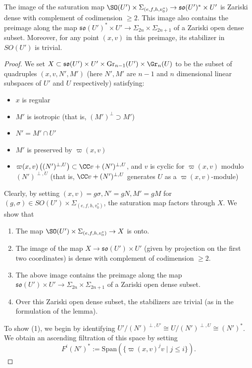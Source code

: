 \documentclass[11pt]{article}
\begin{document}
\begin{lemma}\label{lemma: Sigma saturation}
    The image of the saturation map $\SO(U')\times \Sigma_{(e,f,h, v_0^*)}\to \mathfrak{so}(U')^*\times U'$ is Zariski dense with complement of codimension $\geq 2$. This image also contains the preimage along the map $\mathfrak{so}(U')^*\times U'\to \Sigma_{2n}\times \Sigma_{2n+1}$ of a Zariski open dense subset. Moreover, for any point $(x,v)$ in this preimage, its stabilizer in $SO(U')$ is trivial.
\end{lemma}
\begin{proof}
    We set $X\subset \mathfrak{so}(U')\times U'\times \mathrm{Gr}_{n-1}(U')\times \Gr_n(U)$ to be the subset of quadruples $(x, v, N', M')$ (here $N', M'$ are $n-1$ and $n$ dimensional linear subspaces of $U'$ and $U$ respectively) satisfying:
    \begin{itemize}
        \item $x$ is regular
        \item $M'$ is isotropic (that is, $(M')^\perp \supset M'$)
        \item $N' = M'\cap U'$
        \item $M'$ is preserved by $\varpi(x, v)$
        \item $\varpi(x, v)\left((N')^{\perp, U}\right)\subset \CC v + (N')^{\perp, U}$, and $v$ is cyclic for $\varpi(x,v)$ modulo $(N')^{\perp, U}$ (that is, $\CC v + (N')^{\perp, U}$ generates $U$ as a $\varpi(x,v)$-module)
    \end{itemize}
    Clearly, by setting $(x, v)=g\sigma, N'= gN, M' = gM$ for $(g, \sigma)\in SO(U')\times \Sigma_{(e,f,h, v_0^*)}$, the saturation map factors through $X$.
    We show that
    \begin{enumerate}
        \item The map $\SO(U')\times \Sigma_{(e,f,h, v_0^*)} \to X$ is onto.
        \item The image of the map $X\to \mathfrak{so}(U')\times U'$ (given by projection on the first two coordinates) is dense with complement of codimension $\geq 2$.
        \item The above image contains the preimage along the map $\mathfrak{so}(U')\times U'\to \Sigma_{2n}\times \Sigma_{2n+1}$ of a Zariski open dense subset.
        \item Over this Zariski open dense subset, the stabilizers are trivial (as in the formulation of the lemma).
    \end{enumerate}
    To show (1), we begin by identifying $U' / (N')^{\perp, U'}\cong U / (N')^{\perp, U} \cong (N')^*$. We obtain an ascending filtration of this space by setting $$F^i(N')^*:=\mathrm{Span}(\{\varpi(x, v)^j v\mid j\leq i\}).$$

\end{proof}
\end{document}
